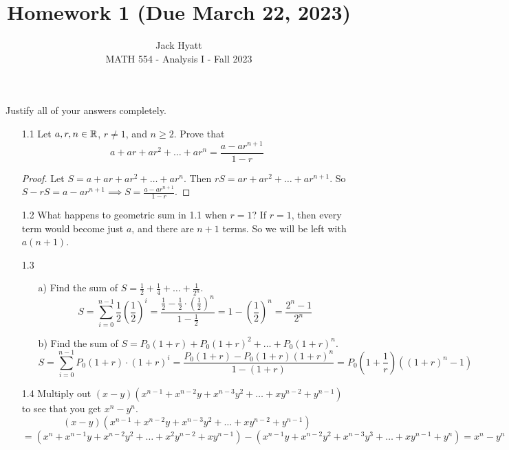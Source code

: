 \documentclass[12pt]{article}
\begin{document}
	
	
	
	\title{Homework 1 (Due March 22, 2023)}
	\author{Jack Hyatt\\ %
		MATH 554 - Analysis I - Fall 2023} 
	
	\maketitle
	
	Justify all of your answers completely.\\
	
	
	\medskip 
	
	\begin{itemize}
		\item [1.1] Let $a,r,n \in \mathbb{R}$, $r \neq 1$, and $n \geq 2$. Prove that $$a+ar+ar^2+\ldots+ar^n = \frac{a-ar^{n+1}}{1-r}$$
		\begin{proof}
			Let $S = a+ar+ar^2+\ldots+ar^n$. Then $rS = ar+ar^2+\ldots+ar^{n+1}$. So $S-rS = a-ar^{n+1} \implies S = \frac{a-ar^{n+1}}{1-r}$. 
		\end{proof}
		
		\item [1.2] What happens to geometric sum in 1.1 when $r = 1$?\m
		If $r = 1$, then every term would become just $a$, and there are $n+1$ terms. So we will be left with $a(n+1)$.
		
		\item [1.3]
			\begin{itemize}
				\item [a)] Find the sum of $S = \frac{1}{2} + \frac{1}{4} + \ldots + \frac{1}{2^n}$.
				\[S = \sum_{i=0}^{n-1}\frac{1}{2}\left(\frac{1}{2}\right)^i = \frac{\frac{1}{2}-\frac{1}{2}\cdot\left(\frac{1}{2}\right)^n}{1-\frac{1}{2}} = 1-\left(\frac{1}{2}\right)^n = \frac{2^n-1}{2^n}\]
				
				\item [b)] Find the sum of $S = P_0(1+r) + P_0(1+r)^2 + \ldots + P_0(1+r)^n$.
				\[S = \sum_{i=0}^{n-1} P_0(1+r)\cdot(1+r)^i = \frac{P_0(1+r) - P_0(1+r)(1+r)^n}{1-(1+r)} = P_0\left(1+\frac{1}{r}\right)((1+r)^{n}-1)\]
			\end{itemize}
		
		\item [1.4] Multiply out $(x-y)(x^{n-1} + x^{n-2}y +x^{n-3}y^2 + \ldots + xy^{n-2} + y^{n-1})$ to see that you get $x^n-y^n$.
		\[(x-y)(x^{n-1} + x^{n-2}y +x^{n-3}y^2 + \ldots + xy^{n-2} + y^{n-1})\] \[= (x^{n} + x^{n-1}y +x^{n-2}y^2 + \ldots + x^2y^{n-2} + xy^{n-1}) - (x^{n-1}y + x^{n-2}y^2 +x^{n-3}y^3 + \ldots + xy^{n-1} + y^{n}) = x^n-y^n \]
		

\end{itemize}
\end{document}
